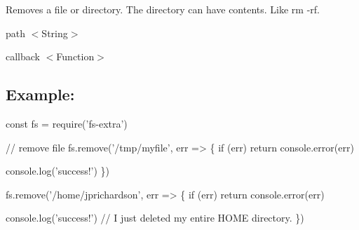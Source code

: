 Removes a file or directory. The directory can have contents. Like {\ttfamily rm -\/rf}.


\begin{DoxyItemize}
\item {\ttfamily path} {\ttfamily $<$String$>$}
\item {\ttfamily callback} {\ttfamily $<$Function$>$}
\end{DoxyItemize}

\subsection*{Example\+:}


\begin{DoxyCode}
const fs = require('fs-extra')

// remove file
fs.remove('/tmp/myfile', err => \{
  if (err) return console.error(err)

  console.log('success!')
\})

fs.remove('/home/jprichardson', err => \{
  if (err) return console.error(err)

  console.log('success!') // I just deleted my entire HOME directory.
\})
\end{DoxyCode}
 